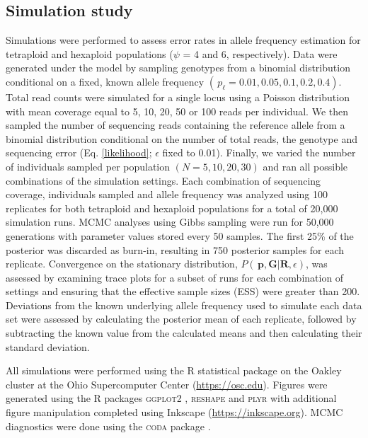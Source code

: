 \documentclass[11pt,english,letterpaper,oneside]{article}
\begin{document}
\medskip
\subsection*{Simulation study}
\medskip

Simulations were performed to assess error rates in allele frequency estimation for tetraploid and hexaploid populations ($\psi$ = 4 and 6, respectively). Data were generated under the model by sampling genotypes from a binomial distribution conditional on a fixed, known allele frequency $(\,p_{\ell} = 0.01, 0.05, 0.1, 0.2, 0.4)$. Total read counts were simulated for a single locus using a Poisson distribution with mean coverage equal to 5, 10, 20, 50 or 100 reads per individual. We then sampled the number of sequencing reads containing the reference allele from a binomial distribution conditional on the number of total reads, the genotype and sequencing error (Eq. \ref{likelihood}; $\epsilon$ fixed to 0.01). Finally, we varied the number of individuals sampled per population $(N = 5, 10, 20, 30)$ and ran all possible combinations of the simulation settings. Each combination of sequencing coverage, individuals sampled and allele frequency was analyzed using 100 replicates for both tetraploid and hexaploid populations for a total of  20,000 simulation runs. MCMC analyses using Gibbs sampling were run for 50,000 generations with parameter values stored every 50 samples. The first 25\% of the posterior was discarded as burn-in, resulting in 750 posterior samples for each replicate. Convergence on the stationary distribution, $P(\,\bm{p},\bm{G}|\bm{R},\epsilon)$, was assessed by examining trace plots for a subset of runs for each combination of settings and ensuring that the effective sample sizes (ESS) were greater than 200. Deviations from the known underlying allele frequency used to simulate each data set were assessed by calculating the posterior mean of each replicate, followed by subtracting the known value from the calculated means and then calculating their standard deviation.
\medskip

All simulations were performed using the R statistical package \citep{r2014} on the Oakley cluster at the Ohio Supercomputer Center (\url{https://osc.edu}). Figures were generated using the R packages \textsc{ggplot2} \citep{wickham2009ggplot2}, \textsc{reshape} \citep{wickham2011plyr} and \textsc{plyr} \citep{wickham2007reshape} with additional figure manipulation completed using Inkscape (\url{https://inkscape.org}). MCMC diagnostics were done using the \textsc{coda} package \citep{plummer2006coda}.
\medskip
\end{document}
